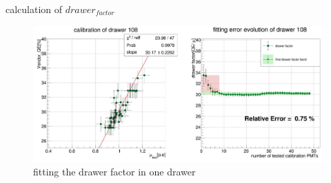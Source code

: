 \documentclass[11pt,compress,xcolor=x11names,UTF8]{beamer}
\begin{document}
\begin{frame}{calculation of $drawer_{factor}$}
\begin{figure}
\centering
\includegraphics[width=\textwidth]{figures/mucal.JPG} %
\caption{fitting the drawer factor in one drawer}
\end{figure}
\end{frame}
\end{document}
